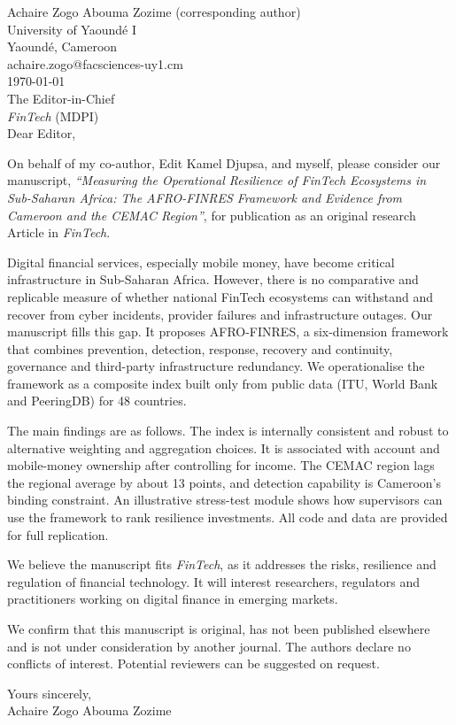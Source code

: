 \documentclass[11pt,a4paper]{article}
\begin{document}
\noindent Achaire Zogo Abouma Zozime (corresponding author)\\ University of Yaound\'e I\\ Yaound\'e, Cameroon\\ achaire.zogo@facsciences-uy1.cm\\[1em]
\today\\[1em]
The Editor-in-Chief\\ \textit{FinTech} (MDPI)\\[1em]
Dear Editor,


On behalf of my co-author, Edit Kamel Djupsa, and myself, please consider our manuscript, \textit{``Measuring the Operational Resilience of FinTech Ecosystems in Sub-Saharan Africa: The AFRO-FINRES Framework and Evidence from Cameroon and the CEMAC Region''}, for publication as an original research Article in \textit{FinTech}.

Digital financial services, especially mobile money, have become critical infrastructure in Sub-Saharan Africa. However, there is no comparative and replicable measure of whether national FinTech ecosystems can withstand and recover from cyber incidents, provider failures and infrastructure outages. Our manuscript fills this gap. It proposes AFRO-FINRES, a six-dimension framework that combines prevention, detection, response, recovery and continuity, governance and third-party infrastructure redundancy. We operationalise the framework as a composite index built only from public data (ITU, World Bank and PeeringDB) for 48 countries.

The main findings are as follows. The index is internally consistent and robust to alternative weighting and aggregation choices. It is associated with account and mobile-money ownership after controlling for income. The CEMAC region lags the regional average by about 13 points, and detection capability is Cameroon's binding constraint. An illustrative stress-test module shows how supervisors can use the framework to rank resilience investments. All code and data are provided for full replication.

We believe the manuscript fits \textit{FinTech}, as it addresses the risks, resilience and regulation of financial technology. It will interest researchers, regulators and practitioners working on digital finance in emerging markets.

We confirm that this manuscript is original, has not been published elsewhere and is not under consideration by another journal. The authors declare no conflicts of interest. Potential reviewers can be suggested on request.


Yours sincerely,\\[2em]
Achaire Zogo Abouma Zozime
\end{document}
